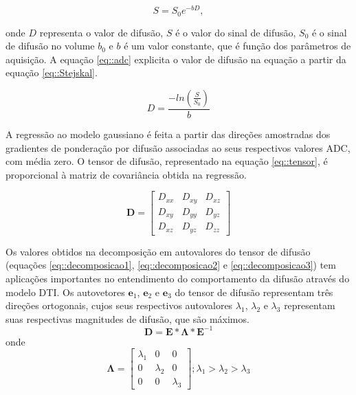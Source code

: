 \documentclass[
    12pt,                %
    oneside,            %
    a4paper,            %
    english,            %
    french,                %
    spanish,            %
    brazil                %
    ]{abntex2}
\begin{document}
\begin{equation}
    S = S_0 e^{-bD},
    \label{eq::Stejskal}
\end{equation}

onde $D$ representa o valor de difusão, $S$ é o valor do sinal de difusão, $S_0$ é o sinal de difusão no volume $b_0$ e $b$ é um valor constante, que é função dos parâmetros de aquisição. A equação \ref{eq::adc} explicita o valor de difusão na equação a partir da equação \ref{eq::Stejskal}.

\begin{equation}
\label{eq::adc}
    D = \frac{-ln(\frac{S}{S_0})}{b}
\end{equation}

A regressão ao modelo gaussiano é feita a partir das direções amostradas dos gradientes de ponderação por difusão associadas ao seus respectivos valores ADC, com média zero. O tensor de difusão, representado na equação \ref{eq::tensor}, é proporcional à matriz de covariância obtida na regressão.

\begin{equation}
\label{eq::tensor}
\mathbf{D} = 
\begin{bmatrix}
D_{xx} & D_{xy} & D_{xz} \\ 
D_{xy} & D_{yy} & D_{yz} \\ 
D_{xz} & D_{yz} & D_{zz}  
\end{bmatrix}
\end{equation}


Os valores obtidos na decomposição em autovalores do tensor de difusão (equações \ref{eq::decomposicao1}, \ref{eq::decomposicao2} e \ref{eq::decomposicao3}) tem aplicações importantes no entendimento do comportamento da difusão através do modelo DTI. Os autovetores $\mathbf{e}_1$, $\mathbf{e}_2$ e $\mathbf{e}_3$ do tensor de difusão representam três direções ortogonais, cujos seus respectivos autovalores $\lambda_1$, $\lambda_2$ e $\lambda_3$ representam suas respectivas magnitudes de difusão, que são máximos. 
\begin{equation}
\label{eq::decomposicao1}
\mathbf{D} = \mathbf{E}*\mathbf{\Lambda}*\mathbf{E}^{-1}
\end{equation}
onde
\begin{equation}
\label{eq::decomposicao2}
\mathbf{\Lambda} = \begin{bmatrix} 
\lambda_1 & 0 & 0 \\ 
0 & \lambda_2 & 0 \\ 
0 & 0 & \lambda_3  
\end{bmatrix};
\lambda_1 > \lambda_2 > \lambda_3
\end{equation}
\end{document}
